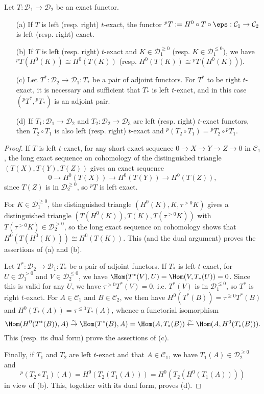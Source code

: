 \begin{proposition}\label{triangle cat t-exact functor prop}
Let $T:\mathcal{D}_1\to\mathcal{D}_2$ be an exact functor.
\begin{enumerate}
    \item[(a)] If $T$ is left (resp. right) $t$-exact, the functor $^pT:=H^0\circ T\circ\eps:\mathcal{C}_1\to\mathcal{C}_2$ is left (resp. right) exact.
    \item[(b)] If $T$ is left (resp. right) $t$-exact and $K\in\mathcal{D}_1^{\geq 0}$ (resp. $K\in\mathcal{D}_1^{\leq 0}$), we have $^pT(H^0(K))\cong H^0(T(K))$ (resp. $H^0(T(K))\cong {^pT}(H^0(K))$).
    \item[(c)] Let $T^*:\mathcal{D}_2\to\mathcal{D}_1:T_*$ be a pair of adjoint functors. For $T^*$ to be right $t$-exact, it is necessary and sufficient that $T_*$ is left $t$-exact, and in this case $({^pT^*},{^pT_*})$ is an adjoint pair.
    \item[(d)] If $T_1:\mathcal{D}_1\to\mathcal{D}_2$ and $T_2:\mathcal{D}_2\to\mathcal{D}_3$ are left (resp. right) $t$-exact functors, then $T_2\circ T_1$ is also left (resp. right) $t$-exact and ${^p(T_2\circ T_1)}={^pT_2}\circ {^pT_1}$.  
\end{enumerate}
\end{proposition}
\begin{proof}
If $T$ is left $t$-exact, for any short exact sequence $0\to X\to Y\to Z\to 0$ in $\mathcal{C}_1$, the long exact sequence on cohomology of the distinguished triangle $(T(X),T(Y),T(Z))$ gives an exact sequence
\[0\to H^0(T(X))\to H^0(T(Y))\to H^0(T(Z)),\]
since $T(Z)$ is in $\mathcal{D}_2^{\geq 0}$, so ${^pT}$ is left exact.\par
For $K\in\mathcal{D}_1^{\geq 0}$, the distinguished triangle $(H^0(K),K,\tau^{>0}K)$ gives a distinguished triangle $(T(H^0(K)),T(K),T(\tau^{>0}K))$ with $T(\tau^{>0}K)\in\mathcal{D}_2^{>0}$, so the long exact sequence on cohomology shows that $H^0(T(H^0(K)))\cong H^0(T(K))$. This (and the dual argument) proves the assertions of (a) and (b).\par
Let $T^*:\mathcal{D}_2\to\mathcal{D}_1:T_*$ be a pair of adjoint functors. If $T_*$ is left $t$-exact, for $U\in\mathcal{D}_1^{>0}$ and $V\in\mathcal{D}_2^{\leq 0}$, we have $\Hom(T^*(V),U)=\Hom(V,T_*(U))=0$. Since this is valid for any $U$, we have $\tau^{>0}T^*(V)=0$, i.e. $T^*(V)$ is in $\mathcal{D}_1^{\leq 0}$, so $T^*$ is right $t$-exact. For $A\in\mathcal{C}_1$ and $B\in\mathcal{C}_2$, we then have $H^0(T^*(B))=\tau^{\geq 0}T^*(B)$ and $H^0(T_*(A))=\tau^{\leq 0}T_*(A)$, whence a functorial isomorphism
\[\Hom(H^0(T^*(B)),A)\stackrel{\sim}{\to} \Hom(T^*(B),A)=\Hom(A,T_*(B))\stackrel{\sim}{\leftarrow} \Hom(A,H^0(T_*(B))).\]
This (resp. its dual form) prove the assertions of (c).\par
Finally, if $T_1$ and $T_2$ are left $t$-exact and that $A\in\mathcal{C}_1$, we have $T_1(A)\in\mathcal{D}_2^{\geq 0}$ and
\[{^p(T_2\circ T_1)}(A)=H^0(T_2(T_1(A)))=H^0(T_2(H^0(T_1(A))))\]
in view of (b). This, together with its dual form, proves (d).
\end{proof}

